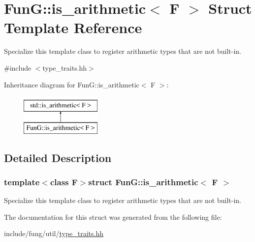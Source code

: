 \hypertarget{structFunG_1_1is__arithmetic}{\section{Fun\-G\-:\-:is\-\_\-arithmetic$<$ F $>$ Struct Template Reference}
\label{structFunG_1_1is__arithmetic}
}


Specialize this template class to register arithmetic types that are not built-\/in.  




{\ttfamily \#include $<$type\-\_\-traits.\-hh$>$}

Inheritance diagram for Fun\-G\-:\-:is\-\_\-arithmetic$<$ F $>$\-:\begin{figure}[H]
\begin{center}
\leavevmode
\includegraphics[height=2.000000cm]{structFunG_1_1is__arithmetic}
\end{center}
\end{figure}


\subsection{Detailed Description}
\subsubsection*{template$<$class F$>$struct Fun\-G\-::is\-\_\-arithmetic$<$ F $>$}

Specialize this template class to register arithmetic types that are not built-\/in. 

The documentation for this struct was generated from the following file\-:\begin{DoxyCompactItemize}
\item 
include/fung/util/\hyperlink{type__traits_8hh}{type\-\_\-traits.\-hh}\end{DoxyCompactItemize}

